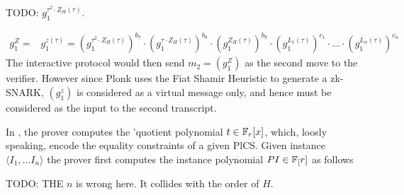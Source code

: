 TODO: $g_1^{\tau^2\cdot Z_H(\tau)}$.

\begin{equation}
\begin{array}{rl}
g_1^Z = & g_1^{z(\tau)} = \left(g_1^{\tau^2\cdot Z_H(\tau)}\right)^{b_7}\cdot
\left(g_1^{\tau\cdot Z_H(\tau)}\right)^{b_8}\cdot\left(g_1^{Z_H(\tau)}\right)^{b_9}\cdot \left(g_1^{L_1(\tau)}\right)^{c_1}\cdot\ldots\cdot \left(g_1^{L_n(\tau)}\right)^{c_n}
\end{array}
\end{equation}
The interactive protocol would then send $m_2=(g_1^Z)$ as the second move to the verifier. However since Plonk uses the Fiat Shamir Heuristic to generate a zk-SNARK, $(g_1^z)$ is considered as a virtual message only, and hence must be considered as the input to the second transcript.

In , the prover computes the 'quotient polynomial $t\in \mathbb{F}_r[x]$, which, loosly speaking, encode the equality constraints of a given PlCS. Given instance $\langle I_1,\ldots I_n\rangle$ the prover first computes the instance polynomial $PI\in \mathbb{F}_[r]$ as follows

TODO: THE $n$ is wrong here. It collides with the order of $H$.

